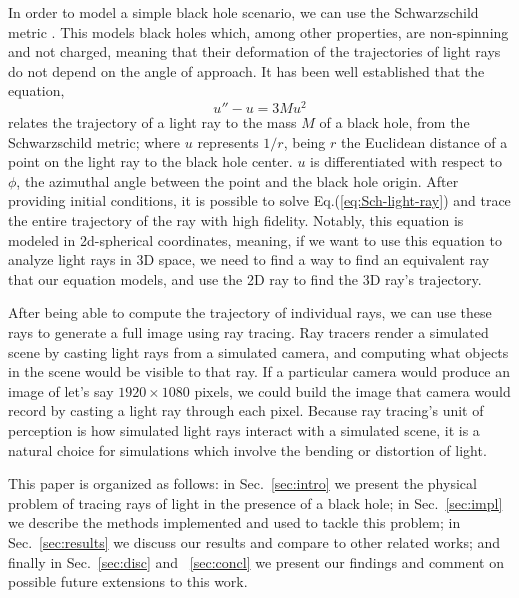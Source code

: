 In order to model a simple black hole scenario, we can use the Schwarzschild metric \cite{schw_soln-2007}.
This models black holes which, among other properties, are non-spinning and not charged,
meaning that their deformation of the trajectories of light rays do not depend on the angle of approach.
It has been well established \cite{gravitation-mtw} that the equation,
\begin{equation}
	u'' - u = 3 M u^2
	\label{eq:Sch-light-ray}
\end{equation}
relates the trajectory of a light ray to the mass $M$ of a black hole, from the Schwarzschild metric;
where $u$ represents $1/r$, being $r$ the Euclidean distance of a point on the light ray to the black hole center.
$u$ is differentiated with respect to $\phi$, the azimuthal angle between the point and the black hole origin.
After providing initial conditions,  it is possible to solve Eq.(\ref{eq:Sch-light-ray}) and trace the entire trajectory of the ray with high fidelity.
Notably, this equation is modeled in 2d-spherical coordinates, meaning, if we want to use this equation to analyze light rays in 3D space, we need to find a way to find an equivalent ray that our equation models, and use the 2D ray to find the 3D ray's trajectory.

After being able to compute the trajectory of individual rays, we can use these rays to generate a full image using ray tracing. Ray tracers render a simulated scene by casting light rays from a simulated camera, and computing what objects in the scene would be visible to that ray. If a particular camera would produce an image of let's say $1920 \times 1080$ pixels, we could build the image that camera would record by casting a light ray through each pixel. Because ray tracing's unit of perception is how simulated light rays interact with a simulated scene, it is a natural choice for simulations which involve the bending or distortion of light.


This paper is organized as follows:
in Sec.~\ref{sec:intro} we present the physical problem of tracing rays of light in the presence of a black hole;
in Sec.~\ref{sec:impl} we describe the methods implemented and used to tackle this problem;
in Sec.~\ref{sec:results} we discuss our results and compare to other related works;
and finally in Sec.~\ref{sec:disc} and ~\ref{sec:concl} we present our findings and comment
on possible future extensions to this work.



